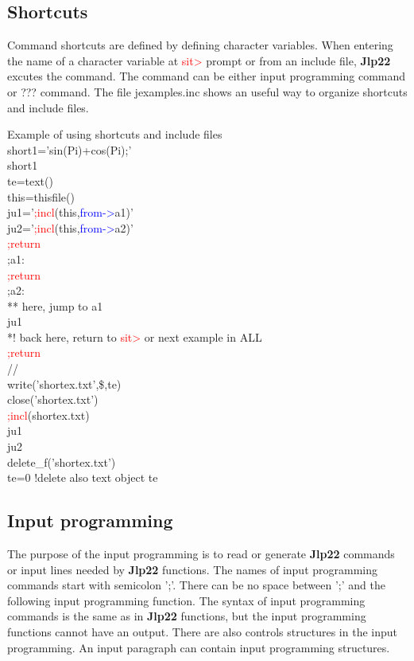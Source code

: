 \subsection{Shortcuts}
\label{short}
Command shortcuts are defined by defining character variables. When entering the
name of a character variable at \textcolor{Red}{sit>} prompt or from an include file, \textbf{Jlp22} excutes the command.
The command can be either input programming command or ??? command. The file jexamples.inc
shows an useful way to organize shortcuts and include files.
\begin{example}[shortex]Example of using shortcuts and include files\\
\label{shortex}
short1='\textcolor{VioletRed}{sin}(Pi)+\textcolor{VioletRed}{cos}(Pi);'\\
short1\\
te=\textcolor{VioletRed}{text}()\\
this=\textcolor{VioletRed}{thisfile}()\\
ju1='\textcolor{Red}{;incl}(this,\textcolor{blue}{from->}a1)'\\
ju2='\textcolor{Red}{;incl}(this,\textcolor{blue}{from->}a2)'\\
\textcolor{Red}{;return}\\
;a1:\\
\textcolor{Red}{;return}\\
;a2:\\
** here, jump to a1\\
ju1\\
*! back here, return to \textcolor{Red}{sit>} or next example in ALL\\
\textcolor{Red}{;return}\\
//\\
\textcolor{VioletRed}{write}('shortex.txt',\$,te)\\
\textcolor{VioletRed}{close}('shortex.txt')\\
\textcolor{Red}{;incl}(shortex.txt)\\
ju1\\
ju2\\
\textcolor{VioletRed}{delete\_f}('shortex.txt')\\
te=0 !delete also text object te
\end{example}
\subsection{Input programming}
\label{inpuprog}
The purpose of the input programming is to read or generate \textbf{Jlp22} commands or input lines
needed by \textbf{Jlp22} functions. The names of input programming commands start with semicolon ';'.
There can be no space between ';' and the following input programming function. The syntax
of input programming commands is the same as in \textbf{Jlp22} functions, but the input programming
functions cannot have an output. There are also controls structures in the input programming.
An input paragraph can contain input programming structures.
